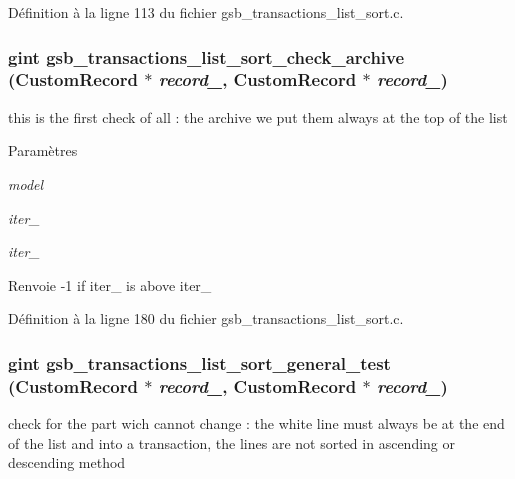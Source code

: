 Définition à la ligne 113 du fichier gsb\_\-transactions\_\-list\_\-sort.c.

\subsubsection[{gsb\_\-transactions\_\-list\_\-sort\_\-check\_\-archive}]{\setlength{\rightskip}{0pt plus 5cm}gint gsb\_\-transactions\_\-list\_\-sort\_\-check\_\-archive ({\bf CustomRecord} $\ast$ {\em record\_}, \/  {\bf CustomRecord} $\ast$ {\em record\_})}\label{gsb__transactions__list__sort_8h_a772947a41069fbbef61f4f63c4c25c2f}
this is the first check of all : the archive we put them always at the top of the list


\begin{DoxyParams}{Paramètres}
\item[{\em model}]\item[{\em iter\_\-1}]\item[{\em iter\_\-2}]\end{DoxyParams}
\begin{DoxyReturn}{Renvoie}
-\/1 if iter\_ is above iter\_ 
\end{DoxyReturn}


Définition à la ligne 180 du fichier gsb\_\-transactions\_\-list\_\-sort.c.

\subsubsection[{gsb\_\-transactions\_\-list\_\-sort\_\-general\_\-test}]{\setlength{\rightskip}{0pt plus 5cm}gint gsb\_\-transactions\_\-list\_\-sort\_\-general\_\-test ({\bf CustomRecord} $\ast$ {\em record\_}, \/  {\bf CustomRecord} $\ast$ {\em record\_})}\label{gsb__transactions__list__sort_8h_a40753d7cbe5a9effda9f91b5261116d3}
check for the part wich cannot change : the white line must always be at the end of the list and into a transaction, the lines are not sorted in ascending or descending method


